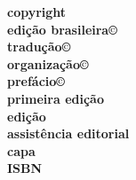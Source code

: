 \newcommand{\linha}[2]{\ifdef{#2}{\linhalayout{#1}{#2}}{}}

\begingroup\tiny
\parindent=0cm
\thispagestyle{empty}

\textbf{copyright}\\
\textbf{edição brasileira©}\\
\textbf{tradução©}\\
\textbf{organização©}\\
\textbf{prefácio©}\\

\textbf{primeira edição}\quad			 	 {}\\

\textbf{edição}\\
\textbf{assistência editorial}\\
\textbf{capa}\\

\textbf{ISBN}\smallskip

 


